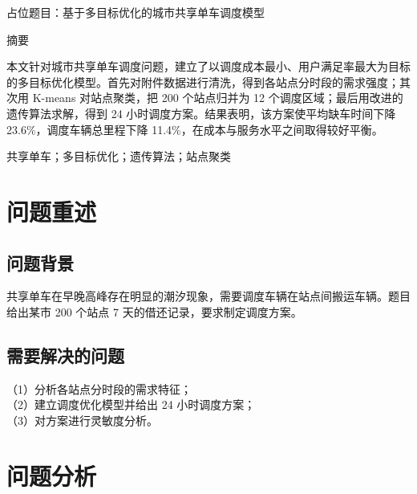 \documentclass[UTF8,a4paper,zihao=-4,fontset=\swfontset]{ctexart}
\begin{document}
\begin{center}
  {\heiti 占位题目：基于多目标优化的城市共享单车调度模型}\\[0.6em]
\end{center}

\vspace{0.4em}
\begin{center}
  {\heiti 摘\quad 要}
\end{center}

本文针对城市共享单车调度问题，建立了以调度成本最小、用户满足率最大为目标的多目标优化模型。首先对附件数据进行清洗，得到各站点分时段的需求强度；其次用 K-means 对站点聚类，把 200 个站点归并为 12 个调度区域；最后用改进的遗传算法求解，得到 24 小时调度方案。结果表明，该方案使平均缺车时间下降 23.6\%，调度车辆总里程下降 11.4\%，在成本与服务水平之间取得较好平衡。

\vspace{0.5em}
共享单车；多目标优化；遗传算法；站点聚类

\newpage

\setcounter{page}{1}

\section{问题重述}

\subsection{问题背景}

共享单车在早晚高峰存在明显的潮汐现象，需要调度车辆在站点间搬运车辆。题目给出某市 200 个站点 7 天的借还记录，要求制定调度方案。

\subsection{需要解决的问题}

（1）分析各站点分时段的需求特征；\\
（2）建立调度优化模型并给出 24 小时调度方案；\\
（3）对方案进行灵敏度分析。

\section{问题分析}
\end{document}
